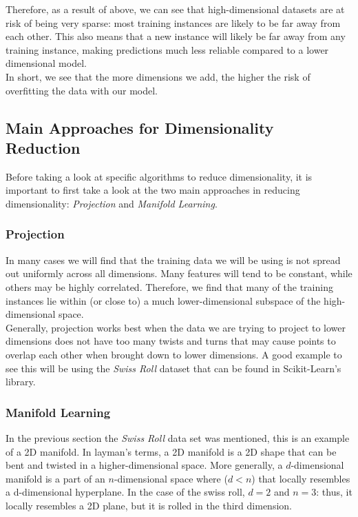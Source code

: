\noindent
Therefore, as a result of above, we can see that high-dimensional datasets are at risk of being very sparse:
most training instances are likely to be far away from each other. This also means that a new instance will
likely be far away from any training instance, making predictions much less reliable compared to a lower 
dimensional model. \\

\noindent
In short, we see that the more dimensions we add, the higher the risk of overfitting the data with our model.

\subsection{Main Approaches for Dimensionality Reduction}

Before taking a look at specific algorithms to reduce dimensionality, it is important to first take a look at
the two main approaches in reducing dimensionality: \textit{Projection} and \textit{Manifold Learning}.

\subsubsection{Projection}

In many cases we will find that the training data we will be using is not spread out uniformly across all
dimensions. Many features will tend to be constant, while others may be highly correlated. Therefore, we find
that many of the training instances lie within (or close to) a much lower-dimensional subspace of the 
high-dimensional space. \\

\noindent
Generally, projection works best when the data we are trying to project to lower dimensions does not have too
many twists and turns that may cause points to overlap each other when brought down to lower dimensions. A
good example to see this will be using the \textit{Swiss Roll} dataset that can be found in Scikit-Learn's
library.

\subsubsection{Manifold Learning}

In the previous section the \textit{Swiss Roll} data set was mentioned, this is an example of a 2D manifold.
In layman's terms, a 2D manifold is a 2D shape that can be bent and twisted in a higher-dimensional space. More
generally, a $d$-dimensional manifold is a part of an $n$-dimensional space where ($d < n$) that locally 
resembles a d-dimensional hyperplane. In the case of the swiss roll, $d = 2$ and $n = 3$: thus, it locally
resembles a 2D plane, but it is rolled in the third dimension. \\

